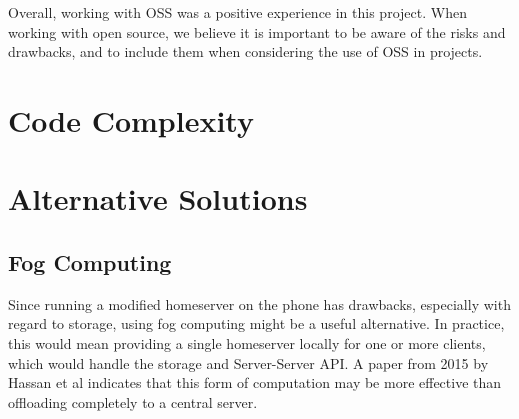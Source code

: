Overall, working with \ac{OSS} was a positive experience in this project.
When working with open source, we believe it is important to be aware of the risks and drawbacks, and to include them when considering the use of \ac{OSS} in projects.

\section{Code Complexity}\label{sec:code_complexity}


\section{Alternative Solutions}\label{sec:alternative_solutions}

\subsection{Fog Computing}\label{sec:fog_computing}
Since running a modified homeserver on the phone has drawbacks, especially with regard to storage, using fog computing might be a useful alternative.
In practice, this would mean providing a single homeserver locally for one or more clients, which would handle the storage and Server-Server \ac{API}.
A paper from 2015 by Hassan et al indicates that this form of computation may be more effective than offloading completely to a central server\cite{hassan2015help}.